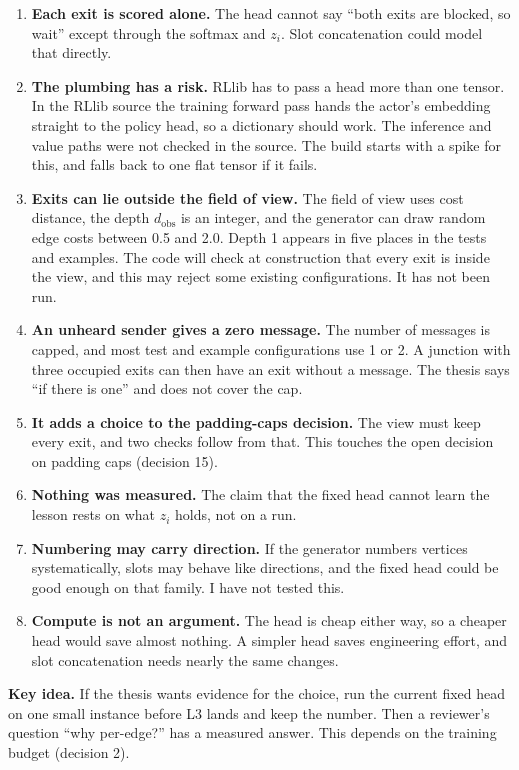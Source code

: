 \documentclass[11pt,a4paper]{article}
\newcommand{\idea}[1]{\par\smallskip\noindent\colorbox{boxbg}{\parbox{\dimexpr\linewidth-2\fboxsep}{\textbf{Key idea.} #1}}\par\smallskip}
\begin{document}
\begin{enumerate}[leftmargin=1.6em, itemsep=3pt]
  \item \textbf{Each exit is scored alone.} The head cannot say ``both exits
    are blocked, so wait'' except through the softmax and $z_i$. Slot
    concatenation could model that directly.
  \item \textbf{The plumbing has a risk.} RLlib has to pass a head more than
    one tensor. In the RLlib source the training forward pass hands the
    actor's embedding straight to the policy head, so a dictionary should
    work. The inference and value paths were not checked in the source. The
    build starts with a spike for this, and falls back to one flat tensor if
    it fails.
  \item \textbf{Exits can lie outside the field of view.} The field of view
    uses cost distance, the depth $d_{\mathrm{obs}}$ is an integer, and the
    generator can draw random edge costs between 0.5 and 2.0. Depth 1
    appears in five places in the tests and examples. The code will check at
    construction that every exit is inside the view, and this may reject
    some existing configurations. It has not been run.
  \item \textbf{An unheard sender gives a zero message.} The number of
    messages is capped, and most test and example configurations use 1 or 2.
    A junction with three occupied exits can then have an exit without a
    message. The thesis says ``if there is one'' and does not cover the cap.
  \item \textbf{It adds a choice to the padding-caps decision.} The view must
    keep every exit, and two checks follow from that. This touches the open
    decision on padding caps (decision 15).
  \item \textbf{Nothing was measured.} The claim that the fixed head cannot
    learn the lesson rests on what $z_i$ holds, not on a run.
  \item \textbf{Numbering may carry direction.} If the generator numbers
    vertices systematically, slots may behave like directions, and the fixed
    head could be good enough on that family. I have not tested this.
  \item \textbf{Compute is not an argument.} The head is cheap either way, so
    a cheaper head would save almost nothing. A simpler head saves
    engineering effort, and slot concatenation needs nearly the same
    changes.
\end{enumerate}

\idea{If the thesis wants evidence for the choice, run the current fixed head
on one small instance before L3 lands and keep the number. Then a reviewer's
question ``why per-edge?'' has a measured answer. This depends on the
training budget (decision 2).}
\end{document}

